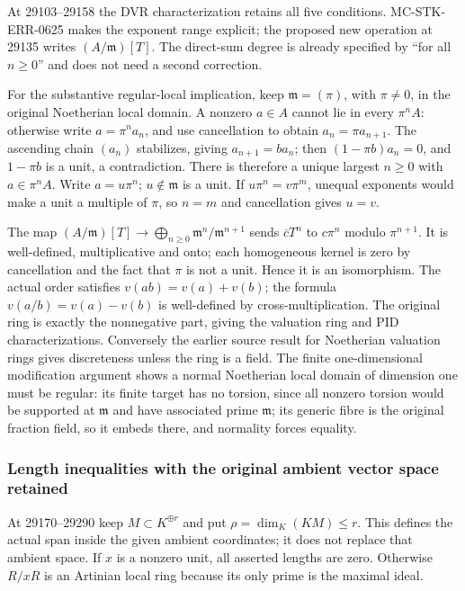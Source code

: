 At 29103--29158 the DVR characterization retains all five conditions. MC-STK-ERR-0625 makes the exponent range explicit; the proposed new operation at 29135 writes \((A/\mathfrak m)[T]\). The direct-sum degree is already specified by ``for all \(n\ge0\)'' and does not need a second correction.

For the substantive regular-local implication, keep \(\mathfrak m=(\pi)\), with \(\pi\ne0\), in the original Noetherian local domain. A nonzero \(a\in A\) cannot lie in every \(\pi^nA\): otherwise write \(a=\pi^n a_n\), and use cancellation to obtain \(a_n=\pi a_{n+1}\). The ascending chain \((a_n)\) stabilizes, giving \(a_{n+1}=b a_n\); then \((1-\pi b)a_n=0\), and \(1-\pi b\) is a unit, a contradiction. There is therefore a unique largest \(n\ge0\) with \(a\in\pi^nA\). Write \(a=u\pi^n\); \(u\notin\mathfrak m\) is a unit. If \(u\pi^n=v\pi^m\), unequal exponents would make a unit a multiple of \(\pi\), so \(n=m\) and cancellation gives \(u=v\).

The map \((A/\mathfrak m)[T]\to\bigoplus_{n\ge0}\mathfrak m^n/\mathfrak m^{n+1}\) sends \(\overline cT^n\) to \(c\pi^n\) modulo \(\pi^{n+1}\). It is well-defined, multiplicative and onto; each homogeneous kernel is zero by cancellation and the fact that \(\pi\) is not a unit. Hence it is an isomorphism. The actual order satisfies \(v(ab)=v(a)+v(b)\); the formula \(v(a/b)=v(a)-v(b)\) is well-defined by cross-multiplication. The original ring is exactly the nonnegative part, giving the valuation ring and PID characterizations. Conversely the earlier source result for Noetherian valuation rings gives discreteness unless the ring is a field. The finite one-dimensional modification argument shows a normal Noetherian local domain of dimension one must be regular: its finite target has no torsion, since all nonzero torsion would be supported at \(\mathfrak m\) and have associated prime \(\mathfrak m\); its generic fibre is the original fraction field, so it embeds there, and normality forces equality.

\subsubsection{Length inequalities with the original ambient vector space retained}\label{length-inequalities-with-the-original-ambient-vector-space-retained}

At 29170--29290 keep \(M\subset K^{\oplus r}\) and put \(\rho=\dim_K(KM)\le r\). This defines the actual span inside the given ambient coordinates; it does not replace that ambient space. If \(x\) is a nonzero unit, all asserted lengths are zero. Otherwise \(R/xR\) is an Artinian local ring because its only prime is the maximal ideal.

